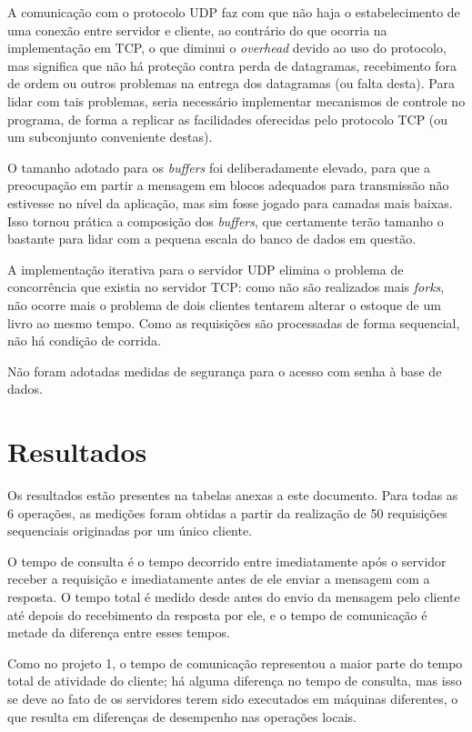 \documentclass[11pt, brazil]{article} %
\begin{document}
A comunicação com o protocolo UDP faz com que não haja o estabelecimento de uma conexão entre servidor e cliente, ao contrário do que ocorria na implementação em TCP, o que diminui o \emph{overhead} devido ao uso do protocolo, mas significa que não há proteção contra perda de datagramas, recebimento fora de ordem ou outros problemas na entrega dos datagramas (ou falta desta). Para lidar com tais problemas, seria necessário implementar mecanismos de controle no programa, de forma a replicar as facilidades oferecidas pelo protocolo TCP (ou um subconjunto conveniente destas).

O tamanho adotado para os \emph{buffers} foi deliberadamente elevado, para que a preocupação em partir a mensagem em blocos adequados para transmissão não estivesse no nível da aplicação, mas sim fosse jogado para camadas mais baixas. Isso tornou prática a composição dos \emph{buffers}, que certamente terão tamanho o bastante para lidar com a pequena escala do banco de dados em questão.

A implementação iterativa para o servidor UDP elimina o problema de concorrência que existia no servidor TCP: como não são realizados mais \emph{forks}, não ocorre mais o problema de dois clientes tentarem alterar o estoque de um livro ao mesmo tempo.
Como as requisições são processadas de forma sequencial, não há condição de corrida.

Não foram adotadas medidas de segurança para o acesso com senha à base de dados.

\section{Resultados}

Os resultados estão presentes na tabelas anexas a este documento. Para todas as 6 operações,
as medições foram obtidas a partir da realização de 50 requisições sequenciais originadas
por um único cliente.

O tempo de consulta é o tempo decorrido entre imediatamente após o servidor receber a requisição e imediatamente antes de ele enviar a mensagem com a resposta. O tempo total é medido desde antes do envio da mensagem pelo cliente até depois do recebimento da resposta por ele, e o tempo de comunicação é metade da diferença entre esses tempos.

Como no projeto 1, o tempo de comunicação representou a maior parte do tempo total de atividade do cliente; há alguma diferença no tempo de consulta, mas isso se deve ao fato de os servidores terem sido executados em máquinas diferentes, o que resulta em diferenças de desempenho nas operações locais.
\end{document}
